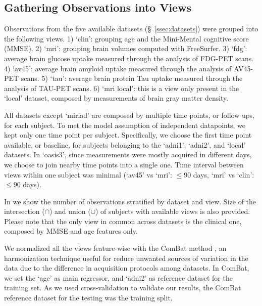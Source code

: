 \subsection{Gathering Observations into Views}
\label{ssec:views}


Observations from the five available datasets (\S~\ref{ssec:datasets}) were grouped into the following views.
1) `clin': grouping age and the Mini-Mental cognitive score (MMSE).
2) `mri': grouping brain volumes computed with FreeSurfer.
3) `fdg': average brain glucose uptake measured through the analysis of FDG-PET scans.
4) `av45': average brain amyloid uptake measured through the analysis of AV45-PET scans.
5) `tau': average brain protein Tau uptake measured through the analysis of TAU-PET scans.
6) `mri local': this is a view only present in the `local' dataset, composed by measurements of brain gray matter density.

All datasets except `miriad' are composed by multiple time points, or follow ups, for each subject.
To met the model assumption of independent datapoints, we kept only one time point per subject.
Specifically, we choose the first time point available, or baseline, for subjects belonging to the `adni1', `adni2', and `local' datasets.
In `oasis3', since measurements were mostly acquired in different days, we choose to join nearby time points into a single one.
Time interval between views within one subject was minimal (`av45' vs `mri': $\leq 90$ days, `mri' vs `clin': $\leq 90$ days).

In  we show the number of observations stratified by dataset and view.
Size of the intersection ($\cap$) and union ($\cup$) of subjects with available views is also provided.
Please note that the only view in common across datasets is the clinical one, composed by MMSE and age features only.

We normalized all the views feature-wise with the ComBat method \citep{Fortin2018}, an harmonization technique useful for reduce unwanted sources of variation in the data due to the difference in acquisition protocols among datasets.
In ComBat, we set the `age' as main regressor, and `adni2' as reference dataset for the training set.
As we used cross-validation to validate our results, the ComBat reference dataset for the testing was the training split.

